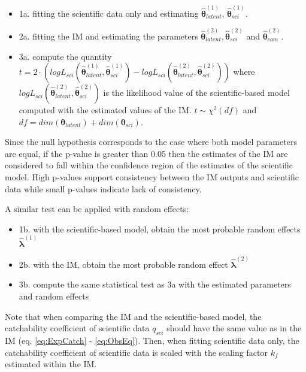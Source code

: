 \begin{itemize}
\item 1a. fitting the scientific data only and estimating \(\hat{\boldsymbol{\theta}}_{latent}^{(1)}\), \(\hat{\boldsymbol{\theta}}_{sci}^{(1)}\).
\item 2a. fitting the IM and estimating the parameters \(\hat{\boldsymbol{\theta}}_{latent}^{(2)}, \hat{\boldsymbol{\theta}}_{sci}^{(2)}\) and \(\hat{\boldsymbol{\theta}}_{com}^{(2)}\).
\item 3a. compute the quantity \(t = 2 \cdot (log L_{sci} (\hat{\boldsymbol{\theta}}_{latent}^{(1)},\hat{\boldsymbol{\theta}}_{sci}^{(1)} ) - log L_{sci} (\hat{\boldsymbol{\theta}}_{latent}^{(2)},\hat{\boldsymbol{\theta}}_{sci}^{(2)}))\) where \(log L_{sci} (\hat{\boldsymbol{\theta}}_{latent}^{(2)},\hat{\boldsymbol{\theta}}_{sci}^{(2)})\) is the likelihood value of the scientific-based model computed with the estimated values of the IM. \(t \sim \chi^2 (df)\) and \(df=dim(\boldsymbol{\theta}_{latent})+dim(\boldsymbol{\theta}_{sci})\).

\end{itemize}

Since the null hypothesis corresponds to the case where both model parameters are equal, if the p-value is greater than 0.05 then the estimates of the IM are considered to fall within the confidence region of the estimates of the scientific model. High p-values support consistency between the IM outputs and scientific data while small p-values indicate lack of consistency.

A similar test can be applied with random effects:

\begin{itemize}
\item 1b. with the scientific-based model, obtain the most probable random effects \(\hat{\boldsymbol{\lambda}}^{(1)}\)
\item 2b. with the IM, obtain the most probable random effect \(\hat{\boldsymbol{\lambda}}^{(2)}\)
\item 3b. compute the same statistical test as 3a with the estimated parameters and random effects
\end{itemize}

Note that when comparing the IM and the scientific-based model, the catchability coefficient of scientific data \(q_{sci}\) should have the same value as in the IM (eq. \ref{eq:ExpCatch} - \ref{eq:ObsEq}). Then, when fitting scientific data only, the catchability coefficient of scientific data is scaled with the scaling factor \(k_f\) estimated within the IM.

